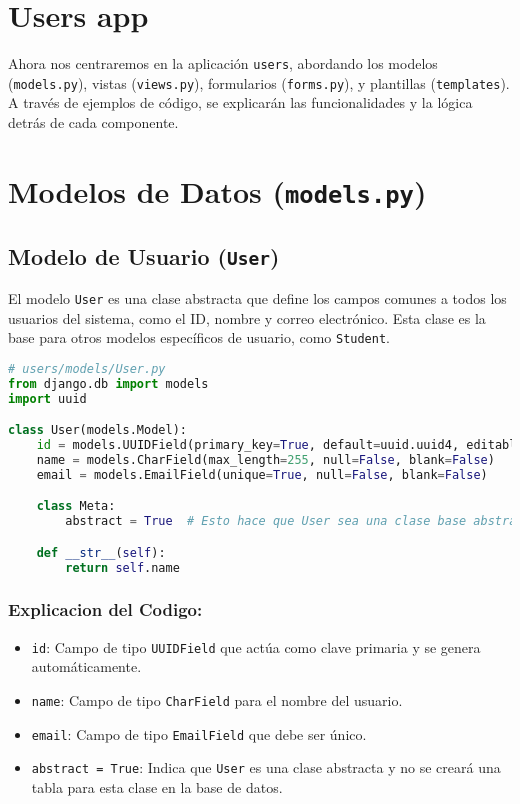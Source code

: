 \section{Users app}

Ahora nos centraremos en la aplicación \texttt{users}, abordando los modelos (\texttt{models.py}), vistas (\texttt{views.py}), formularios (\texttt{forms.py}), y plantillas (\texttt{templates}). A través de ejemplos de código, se explicarán las funcionalidades y la lógica detrás de cada componente.

\section{Modelos de Datos (\texttt{models.py})}

\subsection{Modelo de Usuario (\texttt{User})}

El modelo \texttt{User} es una clase abstracta que define los campos comunes a todos los usuarios del sistema, como el ID, nombre y correo electrónico. Esta clase es la base para otros modelos específicos de usuario, como \texttt{Student}.

\begin{lstlisting}[language=Python, caption=Modelo \texttt{User}]
# users/models/User.py
from django.db import models
import uuid

class User(models.Model):
    id = models.UUIDField(primary_key=True, default=uuid.uuid4, editable=False)
    name = models.CharField(max_length=255, null=False, blank=False)
    email = models.EmailField(unique=True, null=False, blank=False)

    class Meta:
        abstract = True  # Esto hace que User sea una clase base abstracta

    def __str__(self):
        return self.name
\end{lstlisting}

\subsubsection{Explicacion del Codigo: }

\begin{itemize}
\item \texttt{id}: Campo de tipo \texttt{UUIDField} que actúa como clave primaria y se genera automáticamente.
\item \texttt{name}: Campo de tipo \texttt{CharField} para el nombre del usuario.
\item \texttt{email}: Campo de tipo \texttt{EmailField} que debe ser único.
\item \texttt{abstract = True}: Indica que \texttt{User} es una clase abstracta y no se creará una tabla para esta clase en la base de datos.

\end{itemize}

